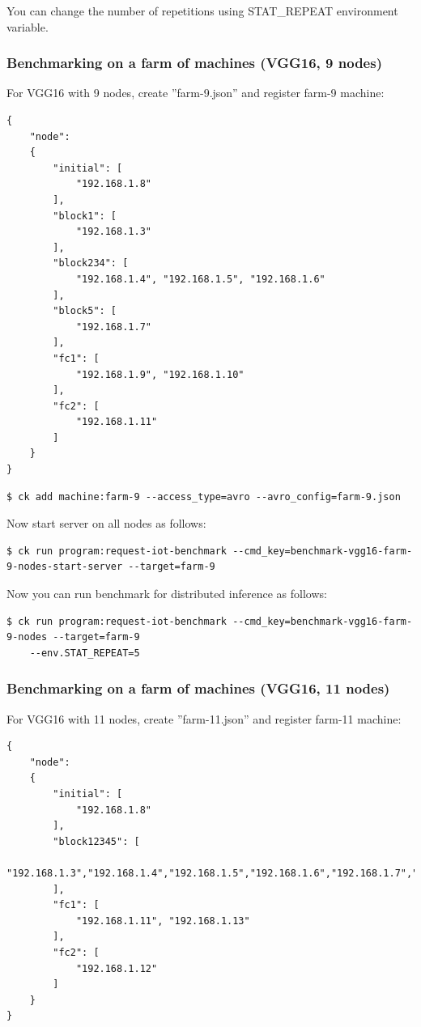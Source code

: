 \documentclass[sigplan]{acmart}
\begin{document}
You can change the number of repetitions using STAT\_REPEAT environment variable.

\subsubsection{Benchmarking on a farm of machines (VGG16, 9 nodes)}

For VGG16 with 9 nodes, create ''farm-9.json'' and register farm-9 machine:
\begin{verbatim}
{
    "node":
    {
        "initial": [
            "192.168.1.8"
        ],
        "block1": [
            "192.168.1.3"
        ],
        "block234": [
            "192.168.1.4", "192.168.1.5", "192.168.1.6"
        ],
        "block5": [
            "192.168.1.7"
        ],
        "fc1": [
            "192.168.1.9", "192.168.1.10"
        ],
        "fc2": [
            "192.168.1.11"
        ]
    }
}
\end{verbatim}

\begin{verbatim}
$ ck add machine:farm-9 --access_type=avro --avro_config=farm-9.json
\end{verbatim}

Now start server on all nodes as follows:
\begin{verbatim}
$ ck run program:request-iot-benchmark --cmd_key=benchmark-vgg16-farm-9-nodes-start-server --target=farm-9 
\end{verbatim}
Now you can run benchmark for distributed inference as follows:
\begin{verbatim}
$ ck run program:request-iot-benchmark --cmd_key=benchmark-vgg16-farm-9-nodes --target=farm-9
    --env.STAT_REPEAT=5
\end{verbatim}

\subsubsection{Benchmarking on a farm of machines (VGG16, 11 nodes)}

For VGG16 with 11 nodes, create ''farm-11.json'' and register farm-11 machine:
\begin{verbatim}
{
    "node":
    {
        "initial": [
            "192.168.1.8"
        ],
        "block12345": [
            "192.168.1.3","192.168.1.4","192.168.1.5","192.168.1.6","192.168.1.7","192.168.1.9","192.168.1.10"
        ],
        "fc1": [
            "192.168.1.11", "192.168.1.13"
        ],
        "fc2": [
            "192.168.1.12"
        ]
    }
}
\end{verbatim}
\end{document}
